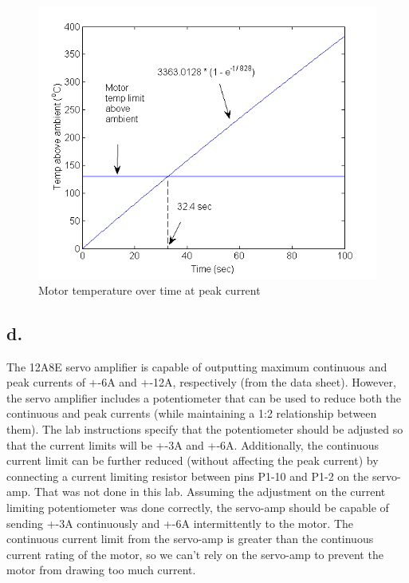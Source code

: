 \documentclass{article}
\theoremstyle{plain}
\theoremstyle{definition}
\theoremstyle{remark}
\begin{document}
\begin{figure}[htb]
\begin{center}
\includegraphics[width = 12cm]{temperature.png}
\caption{Motor temperature over time at peak current}
\label{temperature}
\end{center}
\end{figure}

\subsection*{d.}
The 12A8E servo amplifier is capable of outputting maximum continuous and peak currents of +-6A and +-12A, respectively (from the data sheet). However, the servo amplifier includes a potentiometer that can be used to reduce both the continuous and peak currents (while maintaining a 1:2 relationship between them). The lab instructions specify that the potentiometer should be adjusted so that the current limits will be +-3A and +-6A. Additionally, the continuous current limit can be further reduced (without affecting the peak current) by connecting a current limiting resistor between pins P1-10 and P1-2 on the servo-amp. That was not done in this lab. Assuming the adjustment on the current limiting potentiometer was done correctly, the servo-amp should be capable of sending +-3A continuously and +-6A intermittently to the motor. The continuous current limit from the servo-amp is greater than the continuous current rating of the motor, so we can't rely on the servo-amp to prevent the motor from drawing too much current.\\
\end{document}
